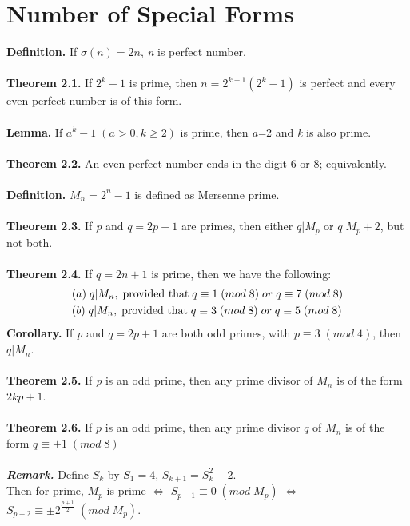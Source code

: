 \documentclass[a4paper,10pt]{article}
\begin{document}
\section{Number of Special Forms}
\textbf{Definition.} If $\sigma(n)=2n$, \textit{n} is perfect number. \\ \\
\textbf{Theorem 2.1.} If $2^{k}-1$ is prime, then $n = 2^{k-1}(2^{k}-1)$ is perfect and every even perfect number is of this form. \\ \\
\textbf{Lemma.} If $a^{k}-1 \; (a>0, k \geq 2)$ is prime, then \textit{a=}2 and \textit{k} is also prime. \\ \\
\textbf{Theorem 2.2.} An even perfect number ends in the digit 6 or 8; equivalently. \\ \\
\textbf{Definition.} $M_{n}=2^{n}-1$ is defined as Mersenne prime. \\ \\
\textbf{Theorem 2.3.} If \textit{p} and $q=2p+1$ are primes, then either $q|M_{p}$ or $q|M_{p}+2$, but not both. \\ \\
\textbf{Theorem 2.4.} If $q=2n+1$ is prime, then we have the following:
\begin{align}
&(a) \; q|M_{n}, \; \textnormal{provided that} \; q \equiv 1 \; (mod \; 8) \; or \; q \equiv 7 \; (mod \; 8) \\
&(b) \; q|M_{n}, \; \textnormal{provided that} \; q \equiv 3 \; (mod \; 8) \; or \; q \equiv 5 \; (mod \; 8) \\
\end{align}
\textbf{Corollary.} If \textit{p} and $q=2p+1$ are both odd primes, with $p\equiv 3 \; (mod \; 4)$, then $q|M_{n}$. \\ \\
\textbf{Theorem 2.5.} If \textit{p} is an odd prime, then any prime divisor of $M_{n}$ is of the form $2kp+1$. \\ \\
\textbf{Theorem 2.6.} If $p$ is an odd prime, then any prime divisor $q$ of $M_{n}$ is of the form $q\equiv \pm1 \; (mod \; 8)$ \\ \\
\textit{\textbf{Remark.}} Define $S_{k}$ by $S_{1}=4$, $S_{k+1}=S_{k}^{2}-2$. \\ Then for prime, $M_{p}$ is prime $\Longleftrightarrow$ $S_{p-1}\equiv 0 \; (mod \; M_{p})$ $\Longleftrightarrow$ $S_{p-2} \equiv \pm 2^{\frac{p+1}{2}} \; (mod \; M_{p})$. \\ \\
\end{document}
